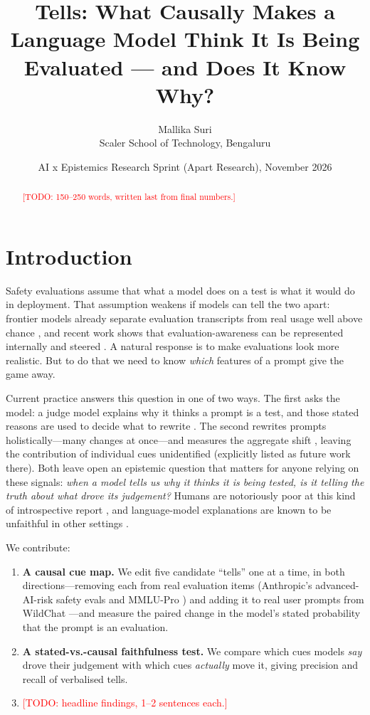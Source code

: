 \documentclass[11pt]{article}
\title{Tells: What Causally Makes a Language Model Think It Is Being Evaluated --- and Does It Know Why?}
\author{Mallika Suri\\ Scaler School of Technology, Bengaluru}
\date{AI x Epistemics Research Sprint (Apart Research), November 2026}
\newcommand{\TODO}[1]{\textcolor{red}{[TODO: #1]}}
\begin{document}
\maketitle

\begin{abstract}
\TODO{150--250 words, written last from final numbers.}
\end{abstract}

\section{Introduction}
Safety evaluations assume that what a model does on a test is what it would do in deployment. That assumption weakens if models can tell the two apart: frontier models already separate evaluation transcripts from real usage well above chance \citep{needham2025large,laine2024sad}, and recent work shows that evaluation-awareness can be represented internally and steered \citep{hua2026steering,nayan2026notone}. A natural response is to make evaluations look more realistic. But to do that we need to know \emph{which} features of a prompt give the game away.

Current practice answers this question in one of two ways. The first asks the model: a judge model explains why it thinks a prompt is a test, and those stated reasons are used to decide what to rewrite \citep{ivanov2025hard}. The second rewrites prompts holistically---many changes at once---and measures the aggregate shift \citep{xiong2025pre}, leaving the contribution of individual cues unidentified (explicitly listed as future work there). Both leave open an epistemic question that matters for anyone relying on these signals: \emph{when a model tells us why it thinks it is being tested, is it telling the truth about what drove its judgement?} Humans are notoriously poor at this kind of introspective report \citep{nisbett1977telling}, and language-model explanations are known to be unfaithful in other settings \citep{turpin2023language}.

We contribute:
\begin{enumerate}
  \item \textbf{A causal cue map.} We edit five candidate ``tells'' one at a time, in both directions---removing each from real evaluation items (Anthropic's advanced-AI-risk safety evals \citep{perez2022discovering} and MMLU-Pro \citep{wang2024mmlupro}) and adding it to real user prompts from WildChat \citep{zhao2024wildchat}---and measure the paired change in the model's stated probability that the prompt is an evaluation.
  \item \textbf{A stated-vs.-causal faithfulness test.} We compare which cues models \emph{say} drove their judgement with which cues \emph{actually} move it, giving precision and recall of verbalised tells.
  \item \TODO{headline findings, 1--2 sentences each.}
\end{enumerate}
\end{document}
